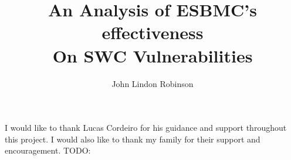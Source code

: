 \documentclass[12pt,BSc,wordcount,twoside]{muthesis}
\begin{document}

\title{An Analysis of ESBMC's effectiveness\\
On SWC Vulnerabilities}
\author{John Lindon Robinson}

\beforeabstract




\afterabstract

I would like to thank Lucas Cordeiro for his guidance and support throughout this project. I would also like to thank my family for their support and encouragement.
TODO: 
\afterpreface










\appendix

\end{document}
